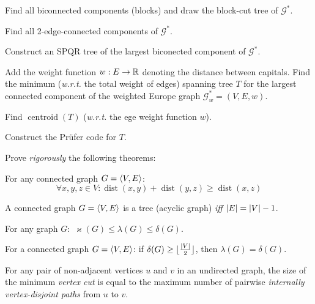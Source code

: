 \documentclass[a4paper,12pt]{article}
\newcommand{\graph}[1][G]{\mathcal{#1}}
\newcommand{\op}[1]{\operatorname*{#1}}
\newcommand{\minDegree}[1]{\delta(#1)}
\newcommand{\graphCentroid}[1]{\op{centroid}(#1)}
\newcommand{\vertexConnectivity}[1]{\varkappa(#1)}
\newcommand{\edgeConnectivity}[1]{\lambda(#1)}
\newcommand{\dist}[1]{\op{dist}(#1)}
\begin{document}
\begin{tasks}
\begin{subtasks}
        \item Find all biconnected components (blocks) and draw the block-cut tree of $\graph^{*}$.
        
        \item Find all 2-edge-connected components of $\graph^{*}$.
        
        \item Construct an SPQR tree of the largest biconected component of $\graph^{*}$.
        
        \item Add the weight function $w: E \to \mathbb{R}$ denoting the distance between capitals. Find the minimum (\textit{w.r.t.} the total weight of edges) spanning tree $T$ for the largest connected component of the weighted Europe graph $\graph^{*}_{w} = (V, E, w)$.
        
        \item Find $\graphCentroid{T}$ (\textit{w.r.t.} the ege weight function $w$).
        
        \item Construct the Prüfer code for $T$.
    \end{subtasks}

    \item Prove \emph{rigorously} the following theorems:
    
    \begin{theorem}
        For any connected graph $G = \langle V, E\rangle$:
        $$\forall x, y, z \in V: \dist{x, y} + \dist{y, z} \geq \dist{x, z}$$
    \end{theorem}

    \begin{theorem}[Tree]
        A connected graph $G = \langle V, E\rangle$ is a tree (\ie acyclic graph) \emph{iff} $\left|E\right| = \left|V\right| - 1$.
    \end{theorem}

    \begin{theorem}[Whitney]
        For any graph $G:$ $\vertexConnectivity{G} \leq \edgeConnectivity{G} \leq \minDegree{G}$.
    \end{theorem}

    \begin{theorem}[Chartrand]
        For a connected graph $G = \langle V, E\rangle$: if $\minDegree{G} \geq \floor{\frac{\card{V}}{2}}$, then $\edgeConnectivity{G} = \minDegree{G}$. 
    \end{theorem}

    \begin{theorem}[Menger]
        For any pair of non-adjacent vertices $u$ and $v$ in an undirected graph, the size of the minimum \textit{vertex cut} is equal to the maximum number of pairwise \textit{internally vertex-disjoint paths} from $u$ to $v$.
    \end{theorem}


\end{tasks}
\end{document}
